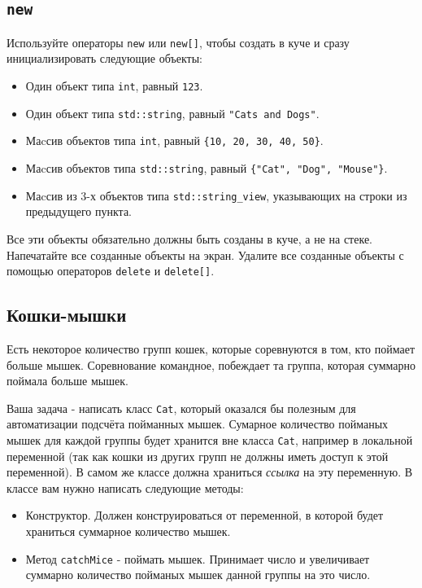 \documentclass{article}
\begin{document}
\subsection{\texttt{new}}
Используйте операторы \texttt{new} или \texttt{new[]}, чтобы создать в куче и сразу инициализировать следующие объекты:
\begin{itemize}
\item Один объект типа \texttt{int}, равный \texttt{123}.
\item Один объект типа \texttt{std::string}, равный \texttt{"Cats and Dogs"}.
\item Маcсив объектов типа \texttt{int}, равный \texttt{\{10, 20, 30, 40, 50\}}.
\item Маcсив объектов типа \texttt{std::string}, равный \texttt{\{"Cat"{}, "Dog"{}, "Mouse"\}}.
\item Маcсив из 3-х объектов типа \texttt{std::string\_view}, указывающих на строки из предыдущего пункта.
\end{itemize}
Все эти объекты обязательно должны быть созданы в куче, а не на стеке.
Напечатайте все созданные объекты на экран.
Удалите все созданные объекты с помощью операторов \texttt{delete} и \texttt{delete[]}.


\subsection{Кошки-мышки}
Есть некоторое количество групп кошек, которые соревнуются в том, кто поймает больше мышек.
Соревнование командное, побеждает та группа, которая суммарно поймала больше мышек.

Ваша задача - написать класс \texttt{Cat}, который оказался бы полезным для автоматизации подсчёта пойманных мышек. Сумарное количество пойманых мышек для каждой группы будет хранится вне класса \texttt{Cat}, например в локальной переменной (так как кошки из других групп не должны иметь доступ к этой переменной). В самом же классе должна храниться \textit{ссылка} на эту переменную. В классе вам нужно написать следующие методы:

\begin{itemize}
\item Конструктор. Должен конструироваться от переменной, в которой будет храниться суммарное количество мышек.
\item Метод \texttt{catchMice} - поймать мышек. Принимает число и увеличивает суммарно количество пойманых мышек данной группы на это число.
\end{itemize}
\end{document}
